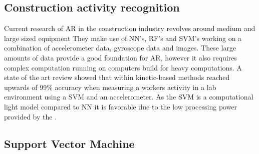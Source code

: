 \subsection{Construction activity recognition}
Current research of AR in the construction industry revolves around medium and large sized equipment \cite{soaWorkersAndEquipment, activityAudioSVM, timeseriesDataAugmentationConstruction}
They make use of NN's, RF's and SVM's working on a combination of accelerometer data, gyroscope data and images. These large amounts of data provide a good foundation for AR, however it also requires complex computation running on computers build for heavy computations.
A state of the art review showed that within kinetic-based methods reached upwards of 99\% accuracy when measuring a workers activity in a lab environment using a SVM and an accelerometer. 
As the SVM is a computational light model compared to NN \cite{comparisonMLAlgorithms} it is favorable due to the low processing power provided by the \kin.

\subsection{Support Vector Machine}  
